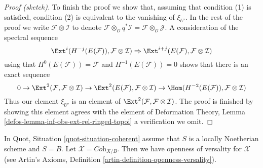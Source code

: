 \begin{proof}[Proof (sketch)]
\medskip\noindent
To finish the proof we show that, assuming that condition (1) is satisfied,
condition (2) is equivalent to the vanishing of $\xi_{U'}$. In the rest
of the proof we write $\mathcal{F} \otimes \mathcal{I}$ to denote
$\mathcal{F} \otimes_\mathcal{O} q^*\mathcal{I} =
\mathcal{F} \otimes_\mathcal{O} \mathcal{J}$. A consideration
of the spectral sequence
$$
\Ext^i(H^{-j}(E(\mathcal{F})), \mathcal{F} \otimes \mathcal{I})
\Rightarrow
\Ext^{i + j}(E(\mathcal{F}), \mathcal{F} \otimes \mathcal{I})
$$
using that $H^0(E(\mathcal{F})) = \mathcal{F}$ and
$H^{-1}(E(\mathcal{F})) = 0$
shows that there is an exact sequence
$$
0 \to
\Ext^2(\mathcal{F}, \mathcal{F} \otimes \mathcal{I}) \to
\Ext^2(E(\mathcal{F}), \mathcal{F} \otimes \mathcal{I}) \to
\Hom(H^{-2}(E(\mathcal{F})), \mathcal{F} \otimes \mathcal{I})
$$
Thus our element $\xi_{U'}$ is an element of
$\Ext^2(\mathcal{F}, \mathcal{F} \otimes \mathcal{I})$.
The proof is finished by showing this element agrees with the
element of
Deformation Theory, Lemma \ref{defos-lemma-inf-obs-ext-rel-ringed-topoi}
a verification we omit.
\end{proof}

\begin{lemma}
\label{lemma-coherent-defo-thy-general}
In Quot, Situation \ref{quot-situation-coherent} assume that
$S$ is a locally Noetherian scheme and $S = B$.
Let $\mathcal{X} = \textit{Coh}_{X/B}$.
Then we have openness of versality for $\mathcal{X}$ (see
Artin's Axioms, Definition \ref{artin-definition-openness-versality}).
\end{lemma}


